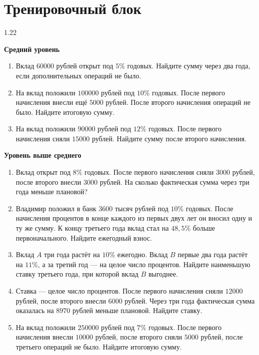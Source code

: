 \documentclass[a4paper,12pt]{article}
\begin{document}
\section*{Тренировочный блок}
\begin{spacing}{1.22}

\textbf{Средний уровень}

\begin{enumerate}
  \item Вклад $60000$ рублей открыт под $5\%$ годовых. Найдите сумму через
  два года, если дополнительных операций не было.

  \item На вклад положили $100000$ рублей под $10\%$ годовых. После первого
  начисления внесли ещё $5000$ рублей. После второго начисления операций не
  было. Найдите итоговую сумму.

  \item На вклад положили $90000$ рублей под $12\%$ годовых. После первого
  начисления сняли $15000$ рублей. Найдите сумму после второго начисления.
\end{enumerate}

\textbf{Уровень выше среднего}

\begin{enumerate}[resume]
  \item Вклад открыт под $8\%$ годовых. После первого начисления сняли
  $3000$ рублей, после второго внесли $3000$ рублей. На сколько фактическая
  сумма через три года меньше плановой?

  \item Владимир положил в банк $3600$ тысяч рублей под $10\%$ годовых. После
  начисления процентов в конце каждого из первых двух лет он вносил одну и ту
  же сумму. К концу третьего года вклад стал на $48{,}5\%$ больше
  первоначального. Найдите ежегодный взнос.

  \item Вклад $A$ три года растёт на $10\%$ ежегодно. Вклад $B$ первые два
  года растёт на $11\%$, а за третий год --- на целое число процентов.
  Найдите наименьшую ставку третьего года, при которой вклад $B$ выгоднее.

  \item Ставка --- целое число процентов. После первого начисления сняли
  $12000$ рублей, после второго внесли $6000$ рублей. Через три года
  фактическая сумма оказалась на $8970$ рублей меньше плановой. Найдите ставку.

  \item На вклад положили $250000$ рублей под $7\%$ годовых. После первого
  начисления внесли $10000$ рублей, после второго сняли $5000$ рублей,
  после третьего операций не было. Найдите итоговую сумму.


\end{enumerate}
\end{spacing}
\end{document}
